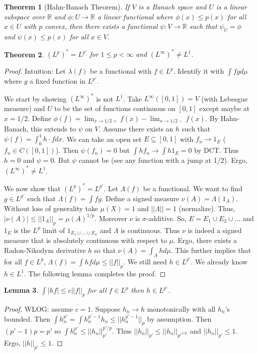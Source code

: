 \documentclass{article}
\newtheorem{theorem}{Theorem}[section]
\newtheorem{lemma}[theorem]{Lemma}
\theoremstyle{definition}
\begin{document}
\begin{theorem}[Hahn-Banach Theorem]
    If $V$ is a Banach space and $U$ is a linear subspace over $\mathbb{R}$ and $\phi:U\rightarrow\mathbb{R}$ a linear functional
    where $\phi(x)\leq p(x)$ for all $x\in U$ with $p$ convex, then there exists a functional $\psi:V\rightarrow\mathbb{R}$ such that
    $\psi_U=\phi$ and $\psi(x)\leq p(x)$ for all $x\in V$. 
\end{theorem}

\begin{theorem}
    $(L^p)^*=L^{p'}$ for $1\leq p<\infty$ and $(L^\infty)^*\neq L^1$.
\end{theorem}

\begin{proof}
    Intuition: Let $\lambda(f)$ be a functional with $f\in L^p$. Identify it with $\int fgd\mu$ where $g$ a fixed function in $L^{p'}$.

    We start by showing $(L^\infty)^*$ is not $L^1$. Take $L^\infty([0,1])=V$ (with Lebesgue measure) and $U$ to be the set of functions continuous on $[0,1]$
    except maybe at $x=1/2$. Define $\phi(f)=\lim_{x\to 1/2 +} f(x)-\lim_{x\to 1/2 -}f(x)$. By Hahn-Banach, this extends to $\psi$ on $V$.
    Assume there exists an $h$ such that $\psi(f)=\int_0^1 h\cdot f d x$. We can take an open set $E\subseteq [0,1]$ with $f_n\to 1_E$ ($f_n\in C([0,1])$).
    Then $\psi(f_n)=0$ but $\int h f_n\to \int h 1_E=0$ by DCT. Thus $h=0$ and $\psi=0$. But $\psi$ cannot be (see any function with a jump at 1/2).
    Ergo, $(L^\infty)^*\neq L^1$.

    We now show that $(L^p)^*=L^{p'}$. Let $\Lambda(f)$ be a functional. We want to find $g\in L^{p'}$ such that $\Lambda(f)=\int fg$.
    Define a signed measure $\nu(A)=\Lambda (1_A)$. Without loss of generality take $\mu(X)=1$ and $||\Lambda||=1$ (normalize).
    Thus, $|\nu(A)|\leq ||1_A||_p=\mu(A)^{1/p}$. Moreover $\nu$ is $\sigma$-additive. So, $E=E_1\cup E_2\cup\ldots$ and
    $1_E$ is the $L^p$ limit of $1_{E_1\cup \dots\cup E_n}$ and $\Lambda$ is continuous. Thus $\nu$ is indeed a signed measure
    that is absolutely continuous with respect to $\mu$. Ergo, there exists a Radon-Nikodym derivative $h$ so that
    $\nu(A)=\int_A h d\mu$. This further implies that for all $f\in L^p$, $\Lambda(f)=\int hf d\mu\leq ||f||_p$. We still need $h\in L^{p'}$.
    We already know $h\in L^1$. The following lemma completes the proof.
\end{proof}

\begin{lemma}
    $\int |hf|\leq c||f||_p$ for all $f\in L^p$ then $h\in L^{p'}$.
\end{lemma}

\begin{proof}
    WLOG: assume $c=1$. Suppose $h_n\to h$ monotonically with all $h_n$'s bounded. Then $\int h_n^{p'}=\int h_n^{p'-1}h_n\leq ||h_n^{p'-1}||_p$ by
    assumption. Then $(p'-1)p=p'$ so $\int h_n^{p'}\leq ||h_n||_{p'}^{p'/p}$. Thus $||h_n||_{p'}\leq ||h_n||_{p'^{1/p}}$ and
    $||h_n||_{p'}\leq 1$. Ergo, $||h||_{p'}\leq 1$.
\end{proof}
\end{document}
